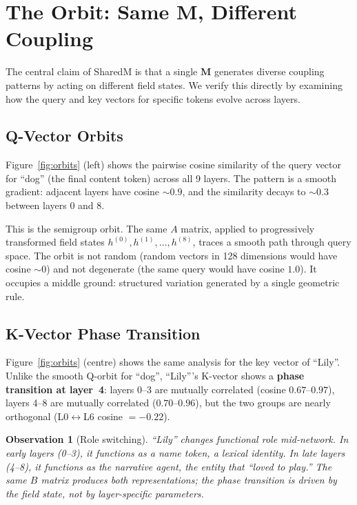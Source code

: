 \documentclass[11pt, a4paper]{article}
\newcommand{\M}{\mathbf{M}}
\theoremstyle{plain}
\newtheorem{observation}{Observation}
\theoremstyle{remark}
\begin{document}
\section{The Orbit: Same M, Different Coupling}\label{sec:orbits}

The central claim of SharedM is that a single $\M$ generates diverse coupling patterns by acting on different field states.
We verify this directly by examining how the query and key vectors for specific tokens evolve across layers.

\subsection{Q-Vector Orbits}

Figure~\ref{fig:orbits} (left) shows the pairwise cosine similarity of the query vector for ``dog'' (the final content token) across all 9 layers.
The pattern is a smooth gradient: adjacent layers have cosine ${\sim}0.9$, and the similarity decays to ${\sim}0.3$ between layers 0 and 8.

This is the semigroup orbit.
The same $A$ matrix, applied to progressively transformed field states $h^{(0)}, h^{(1)}, \ldots, h^{(8)}$, traces a smooth path through query space.
The orbit is not random (random vectors in 128 dimensions would have cosine ${\sim}0$) and not degenerate (the same query would have cosine $1.0$).
It occupies a middle ground: structured variation generated by a single geometric rule.

\subsection{K-Vector Phase Transition}

Figure~\ref{fig:orbits} (centre) shows the same analysis for the key vector of ``Lily''.
Unlike the smooth Q-orbit for ``dog'', ``Lily'''s K-vector shows a \textbf{phase transition at layer~4}: layers 0--3 are mutually correlated (cosine $0.67$--$0.97$), layers 4--8 are mutually correlated ($0.70$--$0.96$), but the two groups are nearly orthogonal (L0$\leftrightarrow$L6 cosine $= -0.22$).

\begin{observation}[Role switching]
``Lily'' changes functional role mid-network.
In early layers (0--3), it functions as a name token, a lexical identity.
In late layers (4--8), it functions as the narrative agent, the entity that ``loved to play.''
The same $B$ matrix produces both representations; the phase transition is driven by the field state, not by layer-specific parameters.
\end{observation}
\end{document}

